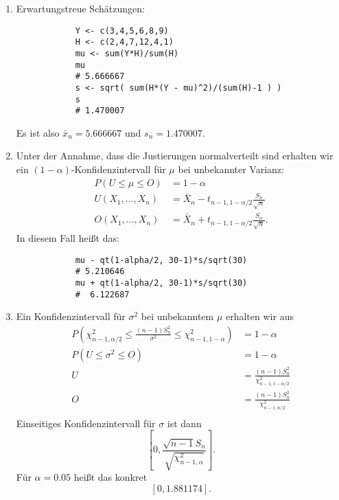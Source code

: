 \solution 
\begin{enumerate}
    \item Erwartungstreue Schätzungen:
        \begin{lstlisting}
            Y <- c(3,4,5,6,8,9) 
            H <- c(2,4,7,12,4,1)
            mu <- sum(Y*H)/sum(H)         
            mu
            # 5.666667
            s <- sqrt( sum(H*(Y - mu)^2)/(sum(H)-1 ) )
            s
            # 1.470007
        \end{lstlisting}
        Es ist also $\bar x_n= 5.666667$ und $s_n = 1.470007$.
    \item Unter der Annahme, dass die Justierungen normalverteilt sind erhalten wir ein
        $(1-\alpha)$-Konfidenzintervall für $\mu$ bei unbekannter Varianz:
        \begin{align*}
            P\left( U \leq \mu \leq O  \right) &= 1-\alpha \\
            U(X_1,\dots ,X_n) &= \bar X_n - t_{n-1, 1-\alpha/2} \frac{S_n}{\sqrt{n}} \\
            O(X_1,\dots ,X_n) &= \bar X_n + t_{n-1, 1-\alpha/2} \frac{S_n}{\sqrt{n}}.
        \end{align*}
        In diesem Fall heißt das:
        \begin{lstlisting}
            mu - qt(1-alpha/2, 30-1)*s/sqrt(30)
            # 5.210646
            mu + qt(1-alpha/2, 30-1)*s/sqrt(30)
            #  6.122687
        \end{lstlisting}
    \item Ein Konfidenzintervall für $\sigma^{2}$ bei unbekanntem $\mu$
        erhalten wir aus
        \begin{align*}
            P\left( 
            \chi^{2}_{n-1, \alpha/2} \leq 
            \frac{(n-1)S^2_n }{\sigma^2} \leq \chi^2_{n-1, 1-\alpha}\right) &=
            1-\alpha \\
            P\left( U \leq \sigma^2 \leq O \right) &= 1-\alpha \\
            U &= \frac{(n-1) S^{2}_{n}}{ \chi^{2}_{n-1, 1-\alpha/2} } \\
            O &= \frac{(n-1) S^{2}_{n}}{ \chi^{2}_{n-1, \alpha/2} } \\
        \end{align*}
        Einseitiges Konfidenzintervall für $\sigma$ ist dann
        \begin{equation*}
            \left[ 0, \frac{\sqrt{n-1} S_n}{ \sqrt{\chi^{2}_{n-1, \alpha}} } \right].
        \end{equation*}
        Für $\alpha=0.05$ heißt das konkret 
        \begin{equation*}
            \left[ 0, 1.881174 \right].
        \end{equation*}
\end{enumerate}


